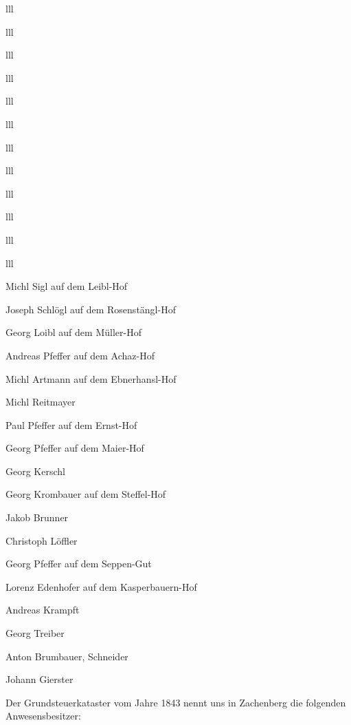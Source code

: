 \documentclass[12pt,a4pager]{book}
\begin{document}
\begin{tabuluar}{lll}
\begin{tabuluar}{lll}
\begin{tabuluar}{lll}
\begin{tabuluar}{lll}
\begin{tabuluar}{lll}
\begin{tabuluar}{lll}
\begin{tabuluar}{lll}
\begin{tabuluar}{lll}
\begin{tabuluar}{lll}
\begin{tabuluar}{lll}
\begin{tabuluar}{lll}
\begin{tabuluar}{lll}
\begin{compactitem}
\item Michl Sigl auf dem Leibl-Hof
\item Joseph Schlögl auf dem Rosenstängl-Hof
\item Georg Loibl auf dem Müller-Hof
\item Andreas Pfeffer auf dem Achaz-Hof
\item Michl Artmann auf dem Ebnerhansl-Hof
\item Michl Reitmayer
\item Paul Pfeffer auf dem Ernst-Hof
\item Georg Pfeffer auf dem Maier-Hof
\item Georg Kerschl
\item Georg Krombauer auf dem Steffel-Hof
\item Jakob Brunner
\item Christoph Löffler
\item Georg Pfeffer auf dem Seppen-Gut
\item Lorenz Edenhofer auf dem Kasperbauern-Hof
\item Andreas Krampft
\item Georg Treiber
\item Anton Brumbauer, Schneider
\item Johann Gierster
\end{compactitem}

Der Grundsteuerkataster vom Jahre 1843 nennt uns in Zachenberg die folgenden
Anwesensbesitzer:


\end{tabuluar}
\end{tabuluar}
\end{tabuluar}
\end{tabuluar}
\end{tabuluar}
\end{tabuluar}
\end{tabuluar}
\end{tabuluar}
\end{tabuluar}
\end{tabuluar}
\end{tabuluar}
\end{tabuluar}
\end{document}
